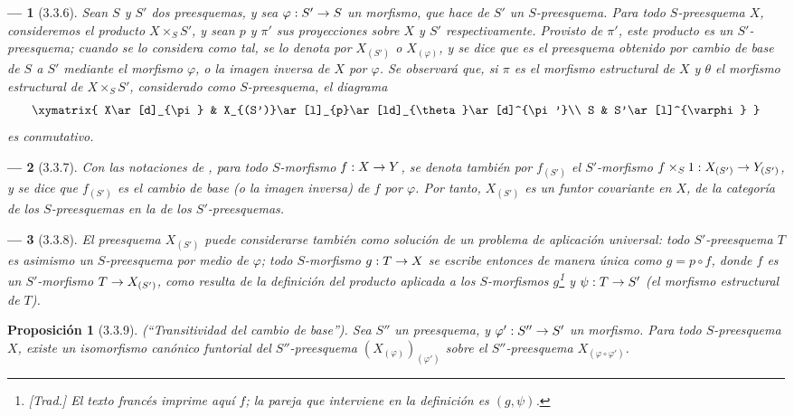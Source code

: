 \documentclass[oneside]{amsart}
\theoremstyle{ega-env-style}
\newtheorem*{env}{---}
\theoremstyle{ega-thm-env-style}
\newtheorem*{proposition}{Proposición}
\theoremstyle{ega-defn-env-style}
\renewcommand{\to}{\mathchoice{\longrightarrow}{\rightarrow}{\rightarrow}{\rightarrow}}
\let\EGAOriginalLabel\label
\renewcommand{\label}[1]{\phantomsection\EGAOriginalLabel{#1}}
\begin{document}
\begin{env}[3.3.6]
\label{I.3.3.6}
Sean $S$ y $S'$ dos preesquemas, y sea $\varphi:S'\to S$ un morfismo, que hace de $S'$ un
$S$-preesquema. Para todo $S$-preesquema $X$, consideremos el producto $X\times_S S'$,
y sean $p$ y $\pi'$ sus proyecciones sobre $X$ y $S'$ respectivamente. Provisto
de $\pi'$, este producto es un $S'$-preesquema; cuando se lo considera como tal, se
lo denota por $X_{(S')}$ o $X_{(\varphi)}$, y se dice que es el preesquema
obtenido por \emph{cambio de base} de $S$ a $S'$ mediante el morfismo
$\varphi$, o la \emph{imagen inversa} de $X$ por $\varphi$. Se observará que, si $\pi$ es
el morfismo estructural de $X$ y $\theta$ el morfismo estructural de
$X\times_S S'$, considerado como $S$-preesquema, el diagrama
\label{I.3.3.6.base-change-diagram-fr}
\[
  \xymatrix{
    X\ar[d]_{\pi} &
    X_{(S')}\ar[l]_{p}\ar[ld]_{\theta}\ar[d]^{\pi'}\\
    S & S'\ar[l]^{\varphi}
  }
\]
es conmutativo.
\end{env}

\begin{env}[3.3.7]
\label{I.3.3.7}
Con las notaciones de , para todo $S$-morfismo $f:X\to Y$, se
denota también por $f_{(S')}$ el $S'$-morfismo $f\times_S 1:X_{(S')}\to Y_{(S')}$, y
se dice que $f_{(S')}$ es el \emph{cambio de base} (o la \emph{imagen inversa}) de
$f$ por $\varphi$. Por tanto, $X_{(S')}$ es un \emph{funtor covariante} en $X$, de
la categoría de los $S$-preesquemas en la de los $S'$-preesquemas.
\end{env}

\begin{env}[3.3.8]
\label{I.3.3.8}
El preesquema $X_{(S')}$ puede considerarse también como solución de un
\emph{problema de aplicación universal}: todo $S'$-preesquema $T$ es asimismo un
$S$-preesquema por medio de $\varphi$; todo $S$-morfismo $g:T\to X$ se escribe entonces
de manera única como $g=p\circ f$, donde $f$ es un $S'$-morfismo
$T\to X_{(S')}$, como resulta de la definición del producto aplicada a los
$S$-morfismos $g$\footnote{\emph{[Trad.] El texto francés imprime aquí $f$;
la pareja que interviene en la definición es $(g,\psi)$.}} y
$\psi:T\to S'$ (el morfismo estructural de $T$).
\end{env}

\begin{proposition}[3.3.9]
\label{I.3.3.9}
\emph{(``Transitividad del cambio de base'')}. Sea $S''$ un preesquema, y
$\varphi':S''\to S'$ un morfismo. Para todo $S$-preesquema $X$, existe un
isomorfismo canónico funtorial del $S''$-preesquema
$(X_{(\varphi)})_{(\varphi')}$ sobre el $S''$-preesquema $X_{(\varphi\circ\varphi')}$.
\end{proposition}
\end{document}
